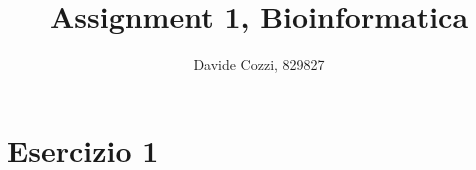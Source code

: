 \documentclass[a4paper,12pt, oneside]{book}
\title{Assignment 1, Bioinformatica}
\author{Davide Cozzi, 829827}
\date{}
\begin{document}
\maketitle

\newtheorem{teorema}{Teorema}
\newtheorem{definizione}{Definizione}
\newtheorem{esempio}{Esempio}
\newtheorem{corollario}{Corollario}
\newtheorem{lemma}{Lemma}
\newtheorem{osservazione}{Osservazione}
\newtheorem{nota}{Nota}
\newtheorem{esercizio}{Esercizio}

\renewcommand{\chaptermark}[1]{%
  \markboth{\chaptername
    \ \thechapter.\ #1}{}}
\renewcommand{\sectionmark}[1]{\markright{\thesection.\ #1}}
\tableofcontents
\chapter{Esercizio 1}
\end{document}
